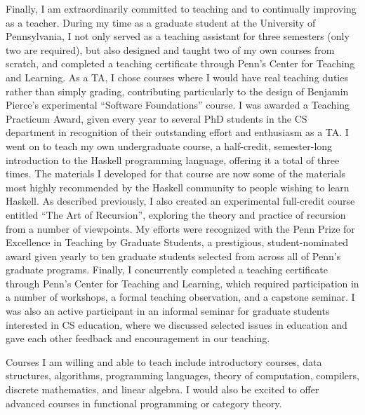 \documentclass[12pt]{article}
\begin{document}

Finally, I am extraordinarily committed to teaching and to continually
improving as a teacher.  During my time as a graduate student at the
University of Pennsylvania, I not only served as a teaching assistant
for three semesters (only two are required), but also designed and
taught two of my own courses from scratch, and completed a teaching
certificate through Penn's Center for Teaching and Learning.  As a TA,
I chose courses where I would have real teaching duties rather than
simply grading, contributing particularly to the design of Benjamin
Pierce's experimental ``Software Foundations'' course. I was awarded a
Teaching Practicum Award, given every year to several PhD students in
the CS department in recognition of their outstanding effort and
enthusiasm as a TA.  I went on to teach my own undergraduate course, a
half-credit, semester-long introduction to the Haskell programming
language, offering it a total of three times. The materials I
developed for that course are now some of the materials most highly
recommended by the Haskell community to people wishing to learn
Haskell.  As described previously, I also created an experimental
full-credit course entitled ``The Art of Recursion'', exploring the
theory and practice of recursion from a number of viewpoints.  My
efforts were recognized with the Penn Prize for Excellence in Teaching
by Graduate Students, a prestigious, student-nominated award given
yearly to ten graduate students selected from across all of Penn's
graduate programs.  Finally, I concurrently completed a teaching
certificate through Penn's Center for Teaching and Learning, which
required participation in a number of workshops, a formal teaching
observation, and a capstone seminar.  I was also an active participant
in an informal seminar for graduate students interested in CS
education, where we discussed selected issues in education and gave
each other feedback and encouragement in our teaching.

Courses I am willing and able to teach include introductory courses,
data structures, algorithms, programming languages, theory of
computation, compilers, discrete mathematics, and linear algebra. I
would also be excited to offer advanced courses in functional
programming or category theory.
\nopagebreak


\end{document}
